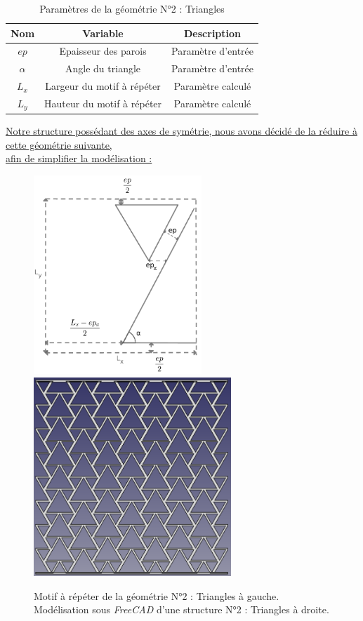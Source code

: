 \documentclass[a4paper]{article}
\begin{document}
	\begin{table}[H]
		\centering
		\begin{tabular}{|c|c|c|}
			\hline
			\rowcolor{Gray}
			\textbf{Nom} & \textbf{Variable} & \textbf{Description} \\
			\hline\hline
			$ep$ & Epaisseur des parois & Paramètre d'entrée \\
			$\alpha$ & Angle du triangle & Paramètre d'entrée \\
			$L_x$ & Largeur du motif à répéter & Paramètre calculé \\
			$L_y$ & Hauteur du motif à répéter & Paramètre calculé \\
			\hline
		\end{tabular}
		\caption{Paramètres de la géométrie N°2 : Triangles}
	\end{table}
	
	\underline{Notre structure possédant des axes de symétrie, nous avons décidé de la réduire à cette géométrie suivante,}\\
	\underline{afin de simplifier la modélisation :}
	
	\begin{figure}[H]
		\centering
		\includegraphics[height=7.5cm]{Images/5/triangle_2.pdf}
		\includegraphics[height=7.5cm]{Images/5/Freecad_triangles.png}
		\caption{Motif à répéter de la géométrie N°2 : Triangles à gauche. Modélisation sous \textit{FreeCAD} d’une structure N°2 : Triangles à droite.}
	\end{figure}
	
\end{document}

